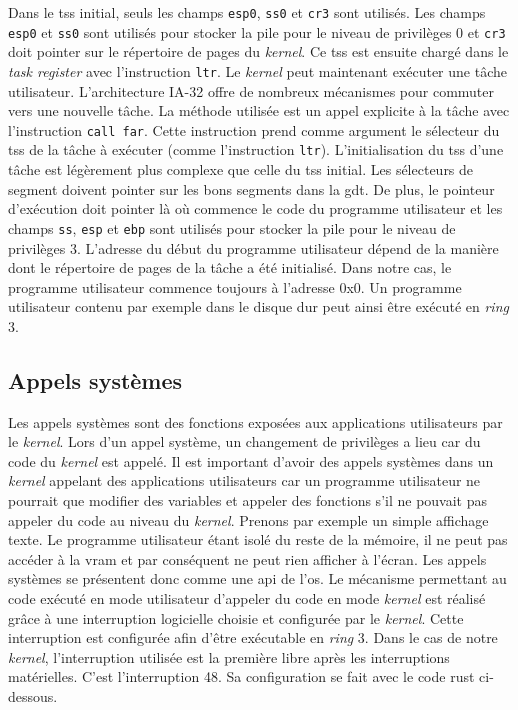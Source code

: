 Dans le \acrshort{tss} initial, seuls les champs \texttt{esp0},
\texttt{ss0} et \texttt{cr3} sont utilisés. Les champs
\texttt{esp0} et \texttt{ss0} sont utilisés pour stocker
la pile pour le niveau de privilèges 0 et \texttt{cr3} doit pointer
sur le répertoire de pages du \textit{kernel}. Ce \acrshort{tss} est ensuite chargé
dans le \textit{task register} avec l'instruction \texttt{ltr}. Le
\textit{kernel} peut maintenant exécuter une tâche utilisateur. L'architecture
\acrshort{IA-32} offre de nombreux mécanismes pour commuter vers une nouvelle
tâche. La méthode utilisée est un appel explicite à la tâche avec l'instruction
\texttt{call far}. Cette instruction prend comme argument le sélecteur
du \acrshort{tss} de la tâche à exécuter (comme l'instruction \texttt{ltr}).
L'initialisation du \acrshort{tss} d'une tâche est légèrement plus complexe que
celle du \acrshort{tss} initial. Les sélecteurs de segment doivent pointer sur les
bons segments dans la \acrshort{gdt}. De plus, le pointeur d'exécution doit
pointer là où commence le code du programme utilisateur et les champs \texttt{ss},
\texttt{esp} et \texttt{ebp} sont utilisés pour stocker la pile
pour le niveau de privilèges 3. L'adresse du début du programme utilisateur dépend
de la manière dont le répertoire de pages de la tâche a été initialisé. Dans notre
cas, le programme utilisateur commence toujours à l'adresse 0x0. Un programme
utilisateur contenu par exemple dans le disque dur peut ainsi être exécuté en
\textit{ring} 3.


\subsection{Appels systèmes}
Les appels systèmes sont des fonctions exposées aux applications utilisateurs par
le \textit{kernel}. Lors d'un appel système, un changement de privilèges a lieu
car du code du \textit{kernel} est appelé. Il est important d'avoir des appels
systèmes dans un \textit{kernel} appelant des applications utilisateurs car
un programme utilisateur ne pourrait que modifier des variables et appeler des
fonctions s'il ne pouvait pas appeler du code au niveau du \textit{kernel}. Prenons
par exemple un simple affichage texte. Le programme utilisateur étant isolé du reste
de la mémoire, il ne peut pas accéder à la \acrshort{vram} et par conséquent ne
peut rien afficher à l'écran. Les appels systèmes se présentent donc comme une
\acrshort{api} de l'\acrshort{os}. Le mécanisme permettant au code exécuté en
mode utilisateur d'appeler du code en mode \textit{kernel}
est réalisé grâce à une interruption logicielle choisie et configurée par le \textit{kernel}.
Cette interruption est configurée afin d'être exécutable en \textit{ring} 3.
Dans le cas de notre \textit{kernel}, l'interruption utilisée est la première libre
après les interruptions matérielles. C'est l'interruption 48. Sa configuration se
fait avec le code rust ci-dessous.

